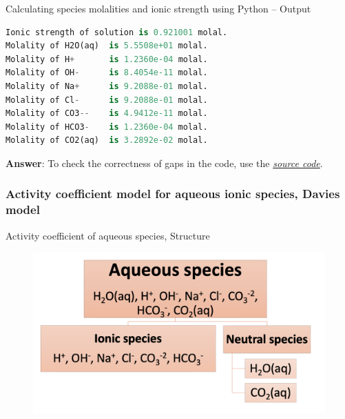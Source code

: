 %
%
\begin{frame}[fragile]{Calculating species molalities and ionic strength using Python -- Output}

\begin{lstlisting}[language=Python, caption=Calculating species molalities and ionic strength using Python -- Output]
Ionic strength of solution is 0.921001 molal.
Molality of H2O(aq)  is 5.5508e+01 molal.
Molality of H+       is 1.2360e-04 molal.
Molality of OH-      is 8.4054e-11 molal.
Molality of Na+      is 9.2088e-01 molal.
Molality of Cl-      is 9.2088e-01 molal.
Molality of CO3--    is 4.9412e-11 molal.
Molality of HCO3-    is 1.2360e-04 molal.
Molality of CO2(aq)  is 3.2892e-02 molal.
\end{lstlisting}

\textbf{Answer}: To check the correctness of gaps in the code, use the  \href{https://polybox.ethz.ch/index.php/s/o0tt6lPtd8TBhoG}{\textcolor{indigo(dye)}{\it source code}}.

\end{frame}
%
\subsubsection{Activity coefficient model for aqueous ionic species, Davies model}
%
%
\begin{frame}{Activity coefficient of aqueous species, Structure}
\begin{figure}
\centering{}\includegraphics[height=0.9\textheight]{figures/activity-models/activity-aqueous-species-1}
\end{figure}


\end{frame}

